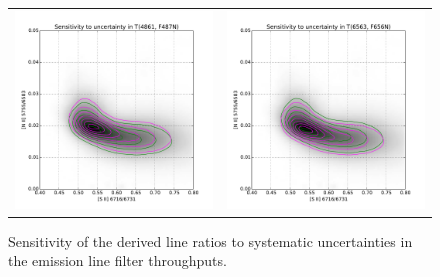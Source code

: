 \documentclass[preprint]{aastex}
\begin{document}
\begin{figure}
\begin{tabular}{ll}
    \includegraphics{ratio-sensitivity-T4861-F487N} &
    \includegraphics{ratio-sensitivity-T6563-F656N} \\
  \end{tabular}
  \caption{Sensitivity of the derived line ratios to systematic
    uncertainties in the emission line filter throughputs.}
  \label{fig:sens-T}
\end{figure}
\end{document}
